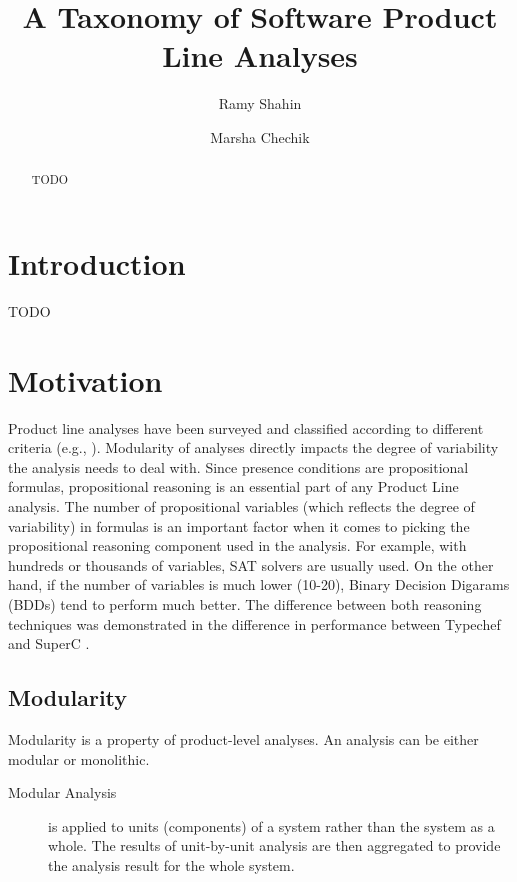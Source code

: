 \documentclass[sigplan]{acmart}
\begin{document}
\title{A Taxonomy of Software Product Line Analyses}

\author{Ramy Shahin}

\author{Marsha Chechik}

\begin{abstract}
TODO
\end{abstract}

\maketitle

\section{Introduction}
TODO

\section{Motivation}
Product line analyses have been surveyed and classified according to different criteria (e.g., \cite{Thum}). 
Modularity of analyses directly impacts the degree of variability the analysis needs to deal with. Since presence conditions are propositional formulas, propositional reasoning is an essential part of any Product Line analysis. The number of propositional variables (which reflects the degree of variability) in formulas is an important factor when it comes to picking the propositional reasoning component used in the analysis. For example, with hundreds or thousands of variables, SAT solvers are usually used. On the other hand, if the number of variables is much lower (10-20), Binary Decision Digarams (BDDs) tend to perform much better. The difference between both reasoning techniques was demonstrated in the difference in performance between Typechef \cite{Kastner} and SuperC \cite{Gazzillo}.

\subsection{Modularity}

Modularity is a property of product-level analyses. An analysis can be either modular or monolithic. 
\begin{description}
\item [Modular Analysis]
is applied to units (components) of a system rather than the system as a whole. The results of unit-by-unit analysis are then aggregated to provide the analysis result for the whole system.
\end{description}
\end{document}

